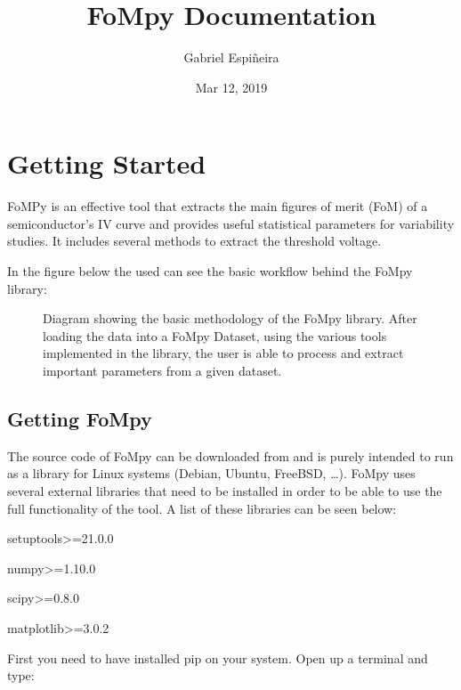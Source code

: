 \documentclass[letterpaper,10pt,english,openany, oneside]{sphinxmanual}
\title{FoMpy Documentation}
\date{Mar 12, 2019}
\author{Gabriel Espiñeira}
\let\sphinxpxdimen\pdfpxdimen\else\newdimen\sphinxpxdimen
\begin{document}
\pagestyle{empty}
\maketitle
\pagestyle{plain}
\sphinxtableofcontents
\pagestyle{normal}
\label{\detokenize{index::doc}}



\chapter{Getting Started}
\label{\detokenize{index:getting-started}}
FoMPy is an effective tool that extracts the main figures of merit (FoM) of a semiconductor’s IV curve and provides useful statistical parameters for variability studies. It includes several methods to extract the threshold voltage.

In the figure below the used can see the basic workflow behind the FoMpy library:

\begin{figure}[htbp]
\centering
\capstart

\noindent\sphinxincludegraphics[width=600\sphinxpxdimen,height=400\sphinxpxdimen]{{simplified_diagram}.jpg}
\caption{Diagram showing the basic methodology of the FoMpy library. After loading the data into a FoMpy Dataset, using the various tools implemented in the library, the user is able to process and extract important parameters from a given dataset.}\label{\detokenize{index:id1}}\end{figure}


\section{Getting FoMpy}
\label{\detokenize{index:getting-fompy}}
The source code of FoMpy can be downloaded from  and is purely intended to run as a library for Linux systems (Debian, Ubuntu, FreeBSD, …). FoMpy uses several external libraries that need to be installed in order to be able to use the full functionality of the tool. A list of these libraries can be seen below:

setuptools\textgreater{}=21.0.0

numpy\textgreater{}=1.10.0

scipy\textgreater{}=0.8.0

matplotlib\textgreater{}=3.0.2

First you need to have installed pip on your system. Open up a terminal and type:
\end{document}
